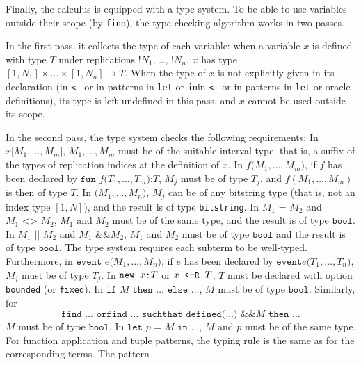 Finally, the calculus is equipped with a type system.
To be able to use variables outside their scope (by \texttt{find}),
the type checking algorithm works in two passes. 

In the first pass, 
it collects the type of each variable: when a variable $x$ is
defined with type $T$ under 
replications $\texttt{!}N_1$, \ldots, $\texttt{!}N_n$,
$x$ has type $[1, N_1] \times \ldots \times [1, N_n] \rightarrow T$.
When the type of $x$ is not explicitly given in its declaration
(\ifchannels in \texttt{<-} or in patterns in \texttt{let} or \texttt{in}\else in \texttt{<-} or 
in patterns in \texttt{let} or oracle definitions\fi), its type is left undefined
in this pass, and $x$ cannot be used outside its scope.

In the second pass, the type system checks the following requirements:
%
In $x\texttt{[}M_1, \ldots, M_m\texttt{]}$, $M_1, \ldots, M_m$ must be of the suitable 
interval type, that is, a suffix of the types of replication indices
at the definition of $x$.
%
In $f\texttt{(}M_1, \ldots, M_m\texttt{)}$, if $f$ has been declared
by $\texttt{fun }f\texttt{(}T_1, \ldots, T_m\texttt{):}T$, $M_j$ must
be of type $T_j$, and $f(M_1, \ldots, M_m)$ is then of type $T$.
%
In $\texttt{(}M_1, \ldots, M_n\texttt{)}$, $M_j$ can be of any
bitstring type (that is, not an index type $[1, N]$), 
and the result is of type \texttt{bitstring}.
%
In $M_1 \texttt{ = }M_2$ and $M_1 \texttt{ <> }M_2$, $M_1$ and $M_2$
must be of the same type, and the result is of type
$\texttt{bool}$. In $M_1 \texttt{ || }M_2$ and $M_1 \texttt{ \&\&
}M_2$, $M_1$ and $M_2$ must be of type $\texttt{bool}$ and the result
is of type $\texttt{bool}$.
%
The type system requires each subterm to be well-typed. 
Furthermore, in $\texttt{event }e\texttt{(}M_1, \ldots,
M_n\texttt{)}$, if $e$ has been declared by $\texttt{event
}e\texttt{(}T_1, \ldots, T_n\texttt{)}$, $M_j$ must be of type $T_j$.
In $\texttt{new\ }{x}\texttt{:}{T}$ or ${x}\texttt{ <-R }{T}$, $T$ must be declared with option {\tt bounded} (or {\tt fixed}).
In $\texttt{if }M\texttt{ then }\ldots\texttt{ else }\ldots$, 
$M$ must be of type $\texttt{bool}$.
Similarly, for
\[\texttt{find }\ldots\texttt{ orfind } \ldots \texttt{ suchthat defined(}
\ldots\texttt{) \&\& }M\texttt{ then }\ldots\]
$M$ must be of type $\texttt{bool}$.
In $\texttt{let }p\texttt{ = }M\texttt{ in }\ldots$, $M$ and $p$ must
be of the same type. For function application and tuple patterns, the
typing rule is the same as for the corresponding terms.  The pattern
